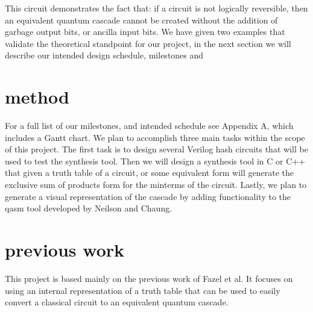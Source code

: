 \documentclass{IEEEtran}
\begin{document}
This circuit demonstrates the fact that: if a circuit is not logically reversible, then an equivalent quantum cascade cannot be created without the addition of garbage output bits, or ancilla input bits.
We have given two examples that validate the theoretical standpoint for our project, in the next section we will describe our intended design schedule, milestones and 

\section{method}

For a full list of our milestones, and intended schedule see Appendix A, which includes a Gantt chart. We plan to accomplish three main tasks within the scope of this project. The first task is to design several Verilog hash circuits that will be used to test the synthesis tool. Then we will design a synthesis tool in C or C++ that given a truth table of a circuit, or some equivalent form will generate the exclusive sum of products form for the minterms of the circuit. Lastly, we plan to generate a visual representation of the cascade by adding functionality to the qasm tool developed by Neilson and Chaung. \cite{}

\section{previous work}
This project is based mainly on the previous work of Fazel et al. \cite{4313212} It focuses on using an internal representation of a truth table that can be used to easily convert a classical circuit to an equivalent quantum cascade. 

{}




\end{document}
